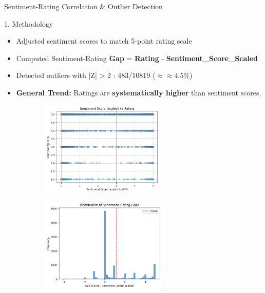 \begin{frame}{Sentiment-Rating Correlation \& Outlier Detection}
    
	\begin{block}{1. Methodology}
		\scriptsize
		\begin{itemize}
			\item Adjusted sentiment scores to match 5-point rating scale
			\item Computed Sentiment-Rating \textbf{Gap} = \textbf{Rating} - \textbf{Sentiment\_Score\_Scaled}
			\item Detected outliers with |Z| > 2 : 483/10819 ($ \approx ≈ 4.5\%$)
			\item \textbf{General Trend:} Ratings are \textbf{systematically higher} than sentiment scores. 
		\end{itemize}
	\end{block}
    
	\vspace{-20pt}
	\begin{figure}[htbp]
		\centering
		\begin{minipage}[t]{0.50\textwidth}
			\vspace{0pt}
			\centering
			\begin{figure}
				\centering
					\includegraphics[height=4.5cm]{pic/sentiment_1.png}
			\end{figure}
		\end{minipage}
		\hfill
		\begin{minipage}[t]{0.49\textwidth}
			\vspace{0pt}
			\centering
			\begin{figure}
				\centering
					\includegraphics[height=4.5cm]{pic/sentiment_2.png}
			\end{figure}
		\end{minipage}
	\end{figure}

\end{frame}


